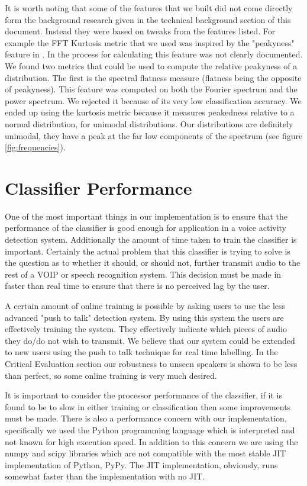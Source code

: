 \documentclass[ %
                    author={Sam Phippen},
                supervisor={Dr. Rafal Bogacz},
                     title={Real time voice activity detectors in noisy personal computing environments},
                  subtitle={},
                    degree={MEng},
                      year={2012} ]{thesis}
\begin{document}
It is worth noting that some of the features that we built did not come
directly form the background research given in the technical background section
of this document. Instead they were based on tweaks from the features listed.
For example the FFT Kurtosis metric that we used was inspired by the
"peakyness" feature in \cite{shin}. In \cite{shin} the process for calculating
this feature was not clearly documented. We found two metrics that could be
used to compute the relative peakyness of a distribution. The first is the
spectral flatness measure (flatness being the opposite of peakyness). This
feature was computed on both the Fourier spectrum and the power spectrum. We
rejected it because of its very low classification accuracy. We ended up using
the kurtosis metric because it measures peakedness relative to a normal
distribution, for unimodal distributions\cite{DeCarlo}. Our distributions are
definitely unimodal, they have a peak at the far low components of the spectrum
(see figure \ref{fig:frequencies}).


\section{Classifier Performance}

One of the most important things in our implementation is to ensure that the
performance of the classifier is good enough for application in a voice activity
detection system. Additionally the amount of time taken to train the classifier
is important. Certainly the actual problem that this classifier is trying to
solve is the question as to whether it should, or should not, further transmit
audio to the rest of a VOIP or speech recognition system. This decision must be
made in faster than real time to ensure that there is no perceived lag by the
user.

A certain amount of online training is possible by asking users to use the less
advanced "push to talk" detection system. By using this system the users are
effectively training the system. They effectively indicate which pieces of
audio they do/do not wish to transmit. We believe that our system could be
extended to new users using the push to talk technique for real time labelling.
In the Critical Evaluation section our robustness to unseen speakers is shown
to be less than perfect, so some online training is very much desired.

It is important to consider the processor performance of the classifier, if it
is found to be to slow in either training or classification then some
improvements must be made. There is also a performance concern with our
implementation, specifically we used the Python\cite{python} programming
language which is interpreted and not known for high execution speed. In
addition to this concern we are using the numpy and scipy libraries which are
not compatible with the most stable JIT implementation of Python,
PyPy\cite{pypy}. The JIT implementation, obviously, runs somewhat faster than
the implementation with no JIT.
\end{document}
